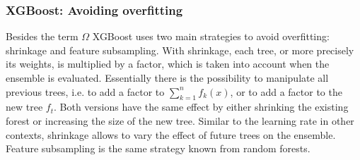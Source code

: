 \subsubsection{XGBoost: Avoiding overfitting}
Besides the term $\Omega$ XGBoost uses two main strategies to avoid overfitting: shrinkage and feature subsampling. With shrinkage, each tree, or more precisely its weights, is multiplied by a factor, which is taken into account when the ensemble is evaluated. Essentially there is the possibility to manipulate all previous trees, i.e. to add a factor to $\sum\limits_{k=1}^n f_k(x)$, or to add a factor to the new tree $f_t$. Both versions have the same effect by either shrinking the existing forest or increasing the size of the new tree. Similar to the learning rate in other contexts, shrinkage allows to vary the effect of future trees on the ensemble. Feature subsampling is the same strategy known from random forests.


